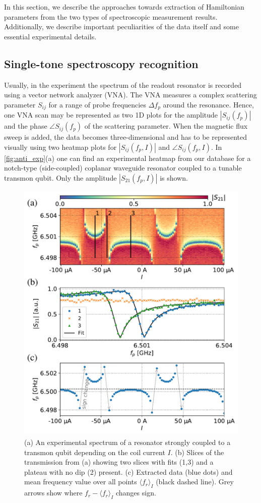 \documentclass[%
 aip,
 amsmath,amssymb,
 reprint,%
]{revtex4-1}
\begin{document}
In this section, we describe the approaches towards extraction of Hamiltonian parameters from the two types of spectroscopic measurement results. Additionally, we describe important peculiarities of the data itself and some essential experimental details.


\subsection{Single-tone spectroscopy recognition}

Usually, in the experiment the spectrum of the readout resonator is recorded using a vector network analyzer (VNA).  The VNA measures a complex scattering parameter $S_{ij}$ for a range of probe frequencies $\Delta f_p$ around the resonance. Hence, one VNA scan may be represented as two 1D plots for the amplitude $|S_{ij}(f_p)|$ and the phase $\angle S_{ij}(f_p)$ of the scattering parameter. When the magnetic flux sweep is added, the data becomes three-dimensional and has to be represented visually using two heatmap plots for $|S_{ij}(f_p, I)|$ and $\angle S_{ij}(f_p, I)$. In \autoref{fig:anti_exp}(a) one can find an experimental heatmap from our database for a notch-type (side-coupled) coplanar waveguide resonator coupled to a tunable transmon qubit. Only the amplitude $|S_{21}(f_p, I)|$ is shown.
\begin{figure}[h!]
\includegraphics[width=\linewidth]{anti_subplots}
\caption{(a) An experimental spectrum of a resonator strongly coupled to a transmon qubit depending on the coil current $I$. (b) Slices of the transmission from (a) showing two slices with fits (1,3) and a plateau with no dip (2) present. (c) Extracted data (blue dots) and mean frequency value over all points $\langle f_r \rangle_{I}$ (black dashed line). Grey arrows show where $f_r - \langle f_r \rangle_{I}$ changes sign.}
\label{fig:anti_exp}
\end{figure}
\end{document}
